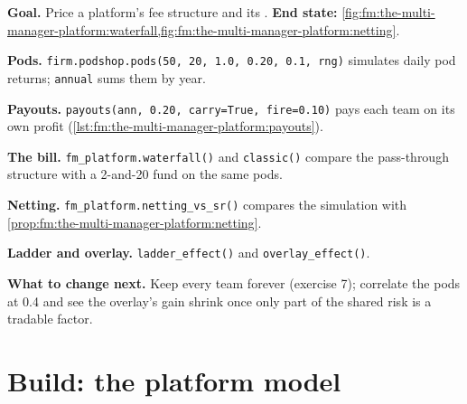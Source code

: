 \begin{tutorial}
\textbf{Goal.} Price a platform's fee structure and its . \textbf{End state:}
\cref{fig:fm:the-multi-manager-platform:waterfall,fig:fm:the-multi-manager-platform:netting}.
\begin{tutsteps}
\item \textbf{Pods.} \texttt{firm.podshop.pods(50, 20, 1.0, 0.20, 0.1, rng)} simulates daily pod returns; \texttt{annual} sums them by year.
\item \textbf{Payouts.} \texttt{payouts(ann, 0.20, carry=True, fire=0.10)} pays each team on its own profit
(\cref{lst:fm:the-multi-manager-platform:payouts}).
\item \textbf{The bill.} \texttt{fm\_platform.waterfall()} and \texttt{classic()} compare the pass-through structure with a 2-and-20 fund on the
same pods.
\item \textbf{Netting.} \texttt{fm\_platform.netting\_vs\_sr()} compares the simulation with \cref{prop:fm:the-multi-manager-platform:netting}.
\item \textbf{Ladder and overlay.} \texttt{ladder\_effect()} and \texttt{overlay\_effect()}.
\end{tutsteps}
\end{tutorial}

\textbf{What to change next.} Keep every team forever (exercise 7); correlate the pods at 0.4 and see the overlay's gain shrink once only part of
the shared risk is a tradable factor.

\section{Build: the platform model}\label{bld:fm:the-multi-manager-platform:podshop}

